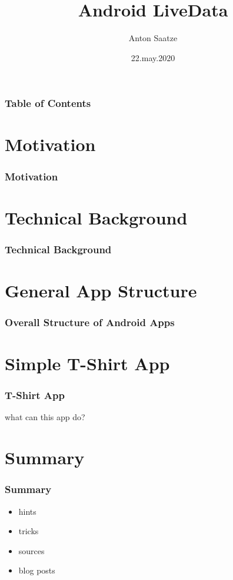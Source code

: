 \documentclass{beamer}
\author{Anton Saatze}
\title{Android LiveData}
\institute{Hochschule fuer Angewandte Wissenschaften Muenchen}
\date{22.may.2020}
\begin{document}
	\maketitle
	\begin{frame}
		\frametitle{Table of Contents}
		\tableofcontents
	\end{frame}
	\section[Motivation]{Motivation}
	\begin{frame}
		\frametitle{Motivation}
	\end{frame}
	\section[Technical Background]{Technical Background}
	\begin{frame}
		\frametitle{Technical Background}
	\end{frame}
	\section[App Structure]{General App Structure}
		\begin{frame}
		\frametitle{Overall Structure of Android Apps}
	\end{frame}
	\section[My App]{Simple T-Shirt App}
	\begin{frame}
		\frametitle{T-Shirt App}
		what can this app do?
	\end{frame}
	\section[Summary]{Summary}
	\begin{frame}
		\frametitle{Summary}
		\begin{itemize}
		\item hints
		\item tricks
		\item sources
		\item blog posts
		\end{itemize}
	\end{frame}
\end{document}
